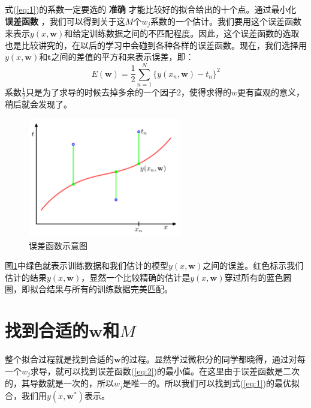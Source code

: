 \documentclass[10pt,a4paper,UTF8]{article}
\begin{document}
式(\ref{eq:1})的系数一定要选的 \textbf{准确} 才能比较好的拟合给出的十个点。通过最小化 \textbf{误差函数} ，我们可以得到关于这\(M\)个\(w_{j}\)系数的一个估计。我们要用这个误差函数来表示\(y(x, \mathbf{w})\)和给定训练数据之间的不匹配程度。因此，这个误差函数的选取也是比较讲究的，在以后的学习中会碰到各种各样的误差函数。现在，我们选择用\(y(x, \mathbf{w})\)和\(\mathbf{t}\)之间的差值的平方和来表示误差，即：
\begin{equation}
\label{eq:2}
E( \mathbf{w}) = \frac{1}{2} \sum_{n=1}^{N}\{y(x_{n}, \mathbf{w}) - t_{n}\}^{2}
\end{equation}
系数\(\frac{1}{2}\)只是为了求导的时候去掉多余的一个因子\(2\)，使得求得的\(w\)更有直观的意义，稍后就会发现了。
\begin{figure}[htbp]
\centering
\includegraphics[width=0.6\textwidth]{../../img/computer_prml/20170430figure1dot3.png}
\caption{\label{fig:orge95bd7d}
误差函数示意图}
\end{figure}

图\ref{fig:orge95bd7d}中绿色就表示训练数据和我们估计的模型\(y(x, \mathbf{w})\)之间的误差。红色标示我们估计的结果\(y(x, \mathbf{w})\)，显然一个比较精确的估计是\(y(x, \mathbf{w})\)穿过所有的蓝色圆圈，即拟合结果与所有的训练数据完美匹配。

\section{找到合适的\(\mathbf{w}\)和\(M\)}
\label{sec:orgdac7769}


整个拟合过程就是找到合适的\(\mathbf{w}\)的过程。显然学过微积分的同学都晓得，通过对每一个\(w_{j}\)求导，就可以找到误差函数(\ref{eq:2})的最小值。在这里由于误差函数是二次的，其导数就是一次的，所以\(w_{j}\)是唯一的。所以我们可以找到式(\ref{eq:1})的最优拟合，我们用\(y(x,\mathbf{w}^{*})\)表示。
\end{document}
